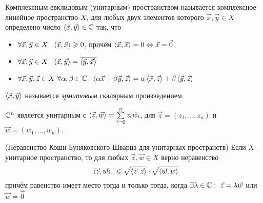 
\begin{definition}
	Комплексным евклидовым (унитарным) пространством называется комплексное линейное пространство $X$, для любых двух элементов которого $\vec{x}, \vec{y} \in X$ определено число $\left\langle\vec{x}, \vec{y}\right\rangle \in \mathbb{C}$ так, что
	\begin{itemize}
		\item $\forall \vec{x}, \vec{y} \in X\ \ \trbr{\vec{x}, \vec{x}} \ge 0$, причём $\left\langle\vec{x}, \vec{x}\right\rangle = 0 \Leftrightarrow \vec{x} = \vec{0}$
		
		\item $\forall \vec{x}, \vec{y} \in X\ \ \trbr{\vec{x}, \vec{y}} = \overline{\trbr{\vec{y}, \vec{x}}}$
		
		\item $\forall \vec{x}, \vec{y}, \vec{z} \in X\ \forall \alpha, \beta \in \mathbb{C}\ \ \left\langle\alpha\vec{x} + \beta\vec{y}, \vec{z}\right\rangle = \alpha\left\langle\vec{x}, \vec{z}\right\rangle + \beta\left\langle\vec{y}, \vec{z}\right\rangle$
	\end{itemize}
	$\left\langle\vec{x}, \vec{y}\right\rangle$ называется \textit{эрмитовым} скалярным произведением.
\end{definition}

\begin{lemma}
	$\mathbb{C}^n$ является унитарным с $\left\langle\vec{z}, \vec{w}\right\rangle = \sum\limits_{i = 0}^n z_i \bar{w_i}$, для $\vec{z} = (z_1, \ldots, z_n)$ и $\vec{w} = (w_1, \ldots, w_n)$.
\end{lemma}


\begin{theorem} (Неравенство Коши-Буняковского-Шварца для унитарных пространств)
	Если $X$ - унитарное пространство, то для любых $\vec{z}, \vec{w} \in X$ верно неравенство
	\[
		|\left\langle\vec{z}, \vec{w}\right\rangle| \leqslant \sqrt{\left\langle\vec{z}, \vec{z}\right\rangle} \cdot \sqrt{\left\langle\vec{w}, \vec{w}\right\rangle}
	\]
	причём равенство имеет место тогда и только тогда, когда $\exists \lambda \in \mathbb{C} :\  \vec{z} = \lambda\vec{w}$ или $\vec{w} = \vec{0}$
\end{theorem}

